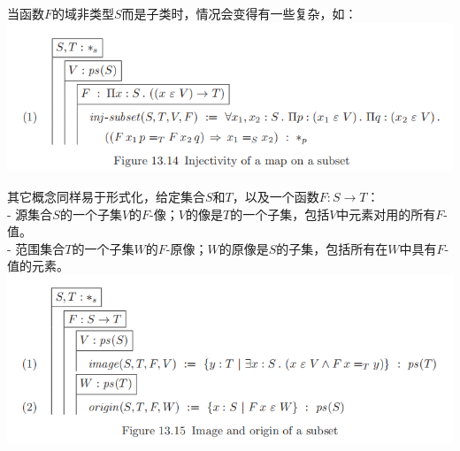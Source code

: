 \documentclass[UTF8]{article}
\begin{document}
		当函数$F$的域非类型$S$而是子类时，情况会变得有一些复杂，如：
		\includegraphics[width=0.93\linewidth]{"../imgs/13-14.png"}
		
		其它概念同样易于形式化，给定集合$S$和$T$，以及一个函数$F:S\rightarrow T$：\\
		- 源集合$S$的一个子集$V$的$F$-像；$V$的像是$T$的一个子集，包括$V$中元素对用的所有$F$-值。\\
		- 范围集合$T$的一个子集$W$的$F$-原像；$W$的原像是$S$的子集，包括所有在$W$中具有$F$-值的元素。\\
		\includegraphics[width=0.93\linewidth]{"../imgs/13-15.png"}
\end{document}
